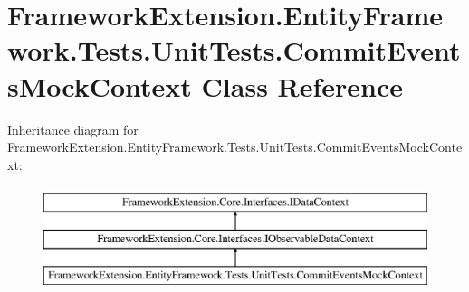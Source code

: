 \hypertarget{class_framework_extension_1_1_entity_framework_1_1_tests_1_1_unit_tests_1_1_commit_events_mock_context}{\section{Framework\-Extension.\-Entity\-Framework.\-Tests.\-Unit\-Tests.\-Commit\-Events\-Mock\-Context Class Reference}
\label{class_framework_extension_1_1_entity_framework_1_1_tests_1_1_unit_tests_1_1_commit_events_mock_context}
}
Inheritance diagram for Framework\-Extension.\-Entity\-Framework.\-Tests.\-Unit\-Tests.\-Commit\-Events\-Mock\-Context\-:\begin{figure}[H]
\begin{center}
\leavevmode
\includegraphics[height=3.000000cm]{class_framework_extension_1_1_entity_framework_1_1_tests_1_1_unit_tests_1_1_commit_events_mock_context}
\end{center}
\end{figure}
